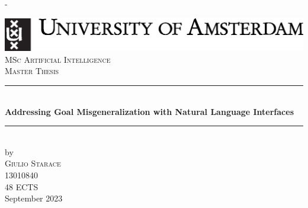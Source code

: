 \documentclass[../main.tex]{subfiles}
\begin{document}
\begin{titlingpage}
    \calccentering\unitlength
    \begin{adjustwidth}{\unitlength}{-\unitlength}
    \newcommand{\HRule}{\rule{\linewidth}{0.5mm}} %
    \center %


    \includegraphics[width=\textwidth]{logos/uvalogo_regular_p_en.eps}\\
    \vfill
    \textsc{\Large MSc Artificial Intelligence}\\[0.2cm]
    \textsc{\Large Master Thesis}\\[0.5cm]


    \HRule \\[0.4cm]
    { \huge \bfseries Addressing Goal Misgeneralization with Natural Language Interfaces} %
    \HRule \\[0.5cm]


    by\\[0.2cm]
    \textsc{\Large Giulio Starace}\\[0.2cm] %
    13010840\\[1cm]


    48 ECTS\\ %
    September 2023\\[1cm]%


\end{adjustwidth}
\end{titlingpage}
\end{document}
